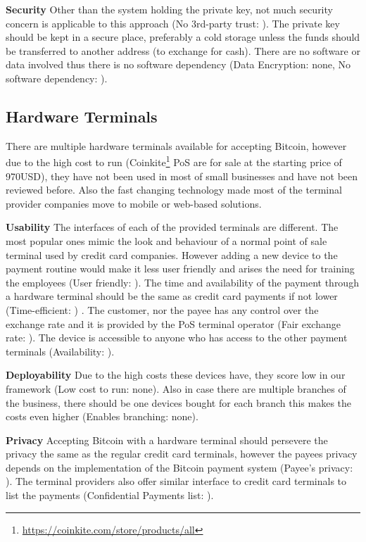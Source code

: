 \textbf{Security} Other than the system holding the private key, not much security concern is applicable to this approach (No 3rd-party trust: \full). The private key should be kept in a secure place, preferably a cold storage unless the funds should be transferred to another address (\eg to exchange for cash). There are no software or data involved thus there is no software dependency (Data Encryption: none, No software dependency: \full).

\subsection{Hardware Terminals}
There are multiple hardware terminals available for accepting Bitcoin, however due to the high cost to run (\eg Coinkite\footnote{\url{https://coinkite.com/store/products/all}} PoS are for sale at the starting price of 970USD), they have not been used in most of small businesses and have not been reviewed before. Also the fast changing technology made most of the terminal provider companies move to mobile or web-based solutions.

\textbf{Usability}
The interfaces of each of the provided terminals are different. The most popular ones mimic the look and behaviour of a normal point of sale terminal used by credit card companies. However adding a new device to the payment routine would make it less user friendly and arises the need for training the employees (User friendly: \prt). The time and availability of the payment through a hardware terminal should be the same as credit card payments if not lower (Time-efficient: \full) . The customer, nor the payee has any control over the exchange rate and it is provided by the PoS terminal operator (Fair exchange rate: \prt). The device is accessible to anyone who has access to the other payment terminals (Availability: \full).

\textbf{Deployability}
Due to the high costs these devices have, they score low in our framework (Low cost to run: none). Also in case there are multiple branches of the business, there should be one devices bought for each branch this makes the costs even higher (Enables branching: none).

\textbf{Privacy}
Accepting Bitcoin with a hardware terminal should persevere the privacy the same as the regular credit card terminals, however the payees privacy depends on the implementation of the Bitcoin payment system (Payee's privacy: \full). The terminal providers also offer similar interface to credit card terminals to list the payments (Confidential Payments list: \full).


